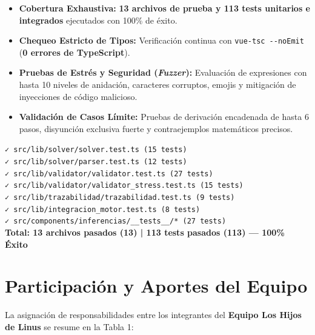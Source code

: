 \documentclass[11pt,a4paper]{article}
\begin{document}
\begin{itemize}[leftmargin=1.2cm]
    \item \textbf{Cobertura Exhaustiva:} \textbf{13 archivos de prueba y 113 tests unitarios e integrados} ejecutados con 100\% de éxito.
    \item \textbf{Chequeo Estricto de Tipos:} Verificación continua con \texttt{vue-tsc -{}-noEmit} (\textbf{0 errores de TypeScript}).
    \item \textbf{Pruebas de Estrés y Seguridad (\textit{Fuzzer}):} Evaluación de expresiones con hasta 10 niveles de anidación, caracteres corruptos, emojis y mitigación de inyecciones de código malicioso.
    \item \textbf{Validación de Casos Límite:} Pruebas de derivación encadenada de hasta 6 pasos, disyunción exclusiva fuerte y contraejemplos matemáticos precisos.
\end{itemize}

\vspace{0.2cm}
\begin{tcolorbox}[colback=lightbg,colframe=accentblue,arc=2mm,title=\textbf{Resultados de la Suite de Pruebas (Vitest)}]
\texttt{✓ src/lib/solver/solver.test.ts (15 tests)}\\
\texttt{✓ src/lib/solver/parser.test.ts (12 tests)}\\
\texttt{✓ src/lib/validator/validator.test.ts (27 tests)}\\
\texttt{✓ src/lib/validator/validator\_stress.test.ts (15 tests)}\\
\texttt{✓ src/lib/trazabilidad/trazabilidad.test.ts (9 tests)}\\
\texttt{✓ src/lib/integracion\_motor.test.ts (8 tests)}\\
\texttt{✓ src/components/inferencias/\_\_tests\_\_/* (27 tests)}\\
\textbf{\textcolor{commentgreen}{Total: 13 archivos pasados (13) | 113 tests pasados (113) — 100\% Éxito}}
\end{tcolorbox}

\newpage
\section{Participación y Aportes del Equipo}

La asignación de responsabilidades entre los integrantes del \textbf{Equipo Los Hijos de Linus} se resume en la Tabla 1:
\end{document}
